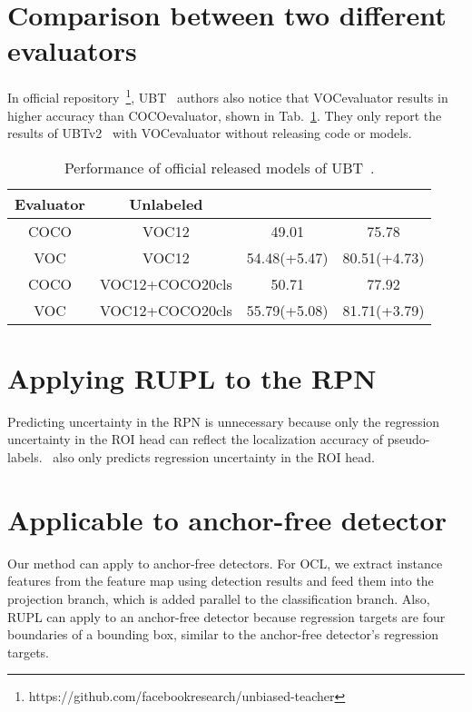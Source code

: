 \documentclass{bmvc2k}
\begin{document}
\section{Comparison between two different evaluators}
\label{cocoVSvoc}
In official repository~\footnote{https://github.com/facebookresearch/unbiased-teacher}, UBT~\cite{liu2021unbiased} authors also notice that VOCevaluator results in higher accuracy than COCOevaluator, shown in Tab.~\ref{tab:eval}. They only report the results of UBTv2~\cite{ubteacherv2} with VOCevaluator without releasing code or models.
\begin{table}[h]
    \centering
    \scriptsize
    \begin{tabular}{c|c|c|c}
        \toprule
        Evaluator& Unlabeled &  &  \\
        \midrule
        COCO & VOC12 & 49.01 & 75.78 \\
        VOC & VOC12 & 54.48(+5.47) & 80.51(+4.73) \\
        \midrule
        COCO & VOC12+COCO20cls & 50.71 & 77.92 \\
        VOC &  VOC12+COCO20cls & 55.79(+5.08) & 81.71(+3.79) \\
        \bottomrule
    \end{tabular}
    \caption{Performance of official released models of UBT~\cite{liu2021unbiased}.}
    \label{tab:eval}
\end{table}

\section{Applying RUPL to the RPN}
Predicting uncertainty in the RPN is unnecessary because only the regression uncertainty in the ROI head can reflect the localization accuracy of pseudo-labels.~\cite{box_regression_uncertainty} also only predicts regression uncertainty in the ROI head. 

\section{Applicable to anchor-free detector} 
Our method can apply to anchor-free detectors. For OCL, we extract instance features from the feature map using detection results and feed them into the projection branch, which is added parallel to the classification branch. Also, RUPL can apply to an anchor-free detector because regression targets are four boundaries of a bounding box, similar to the anchor-free detector's regression targets.
\end{document}
